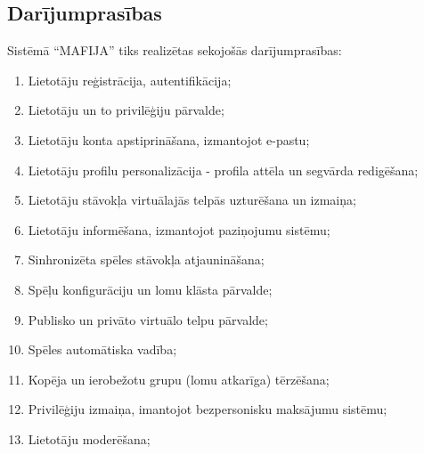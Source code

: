 \subsection{Darījumprasības}
Sistēmā ``MAFIJA'' tiks  realizētas sekojošās darījumprasības:
\begin{enumerate}
	\item Lietotāju reģistrācija, autentifikācija;
	\item Lietotāju un to privilēģiju pārvalde;
	\item Lietotāju konta apstiprināšana, izmantojot e-pastu;
	\item Lietotāju profilu personalizācija - profila attēla un segvārda redigēšana;
	\item Lietotāju stāvokļa virtuālajās telpās uzturēšana un izmaiņa;
	\item Lietotāju informēšana, izmantojot paziņojumu sistēmu;
	\item Sinhronizēta spēles stāvokļa atjaunināšana;
	\item Spēļu konfigurāciju un lomu klāsta pārvalde;
	\item Publisko un privāto virtuālo telpu pārvalde;
	\item Spēles automātiska vadība;
	\item Kopēja un ierobežotu grupu (lomu atkarīga) tērzēšana;
	\item Privilēģiju izmaiņa, imantojot bezpersonisku maksājumu sistēmu;
	\item Lietotāju moderēšana;
\end{enumerate}
